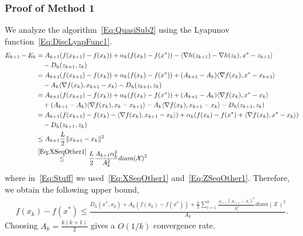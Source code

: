 \documentclass[11pt]{article}
\theoremstyle{plain}
\newcommand{\X}{{\mathcal X}}
\begin{document}
\subsubsection{Proof of Method 1} We analyze the algorithm~\eqref{Eq:QuasiSub2} using the Lyapunov function~\eqref{Eq:DiscLyapFunc1}. 
\begin{subequations}
\begin{align}
E_{k+1} - E_k %
&= A_{k+1}(f(x_{k+1}) -f(x_k)) + \alpha_k(f(x_k) - f(x^\ast)) - \langle \nabla h(z_{k+1}) - \nabla h(z_k), x^\ast - z_{k+1} \rangle\notag\\
&\quad- D_h(z_{k+1}, z_k) \notag\\
 &= A_{k+1}(f(x_{k+1}) -f(x_k)) + \alpha_k(f(x_k) - f(x^\ast)) + (A_{k+1} - A_k)\langle \nabla f(x_k), x^\ast - x_{k+1}\rangle \notag\\
 &\quad -A_{k} \langle \nabla f(x_k), x_{k+1} - x_k\rangle - D_h(z_{k+1}, z_k) \label{Eq:Stuff}\\
 &= A_{k+1}(f(x_{k+1}) -f(x_k)) + \alpha_k(f(x_k) - f(x^\ast)) + (A_{k+1} - A_k)\langle \nabla f(x_k), x^\ast - x_{k}\rangle \notag\\
 &\quad  + (A_{k+1} - A_k)\langle \nabla f(x_k), x_{k}- x_{k+1}\rangle -A_{k} \langle \nabla f(x_k), x_{k+1} - x_k\rangle - D_h(z_{k+1}, z_k)\notag\\
  &= A_{k+1}(f(x_{k+1}) -f(x_k) - \langle \nabla f(x_k), x_{k+1} - x_k\rangle) + \alpha_k(f(x_k) - f(x^\ast)+\langle \nabla f(x_k), x^\ast - x_{k}\rangle)  \notag \\ &\quad- D_h(z_{k+1}, z_k) \notag\\
 & \leq A_{k+1} \frac{L}{2}\| x_{k+1} - x_{k}\|^2 \notag\\
& \overset{\eqref{Eq:XSeqOther1}}{\leq}  \frac{L}{2} \frac{A_{k+1}\alpha_k^2}{A_{k}^2}diam(\X)^2
\end{align}
\end{subequations}
where in~\eqref{Eq:Stuff} we used~\eqref{Eq:XSeqOther1} and~\eqref{Eq:ZSeqOther1}. Therefore, we obtain the following upper bound, 
\begin{align*}
f(x_k) - f(x^\ast) \leq \frac{D_h(x^\ast, x_0) + A_0(f(x_0)- f(x^\ast)) +  \frac{L}{2}\sum_{i=1}^k \frac{A_{i+1}(A_{i+1} - A_{i})^2}{A_{i}^2}diam(\X)^2 }{A_k}.
\end{align*}
Choosing $A_k = \frac{k(k+1)}{2}$ gives a $O(1/k)$ convergence rate. 
\end{document}
